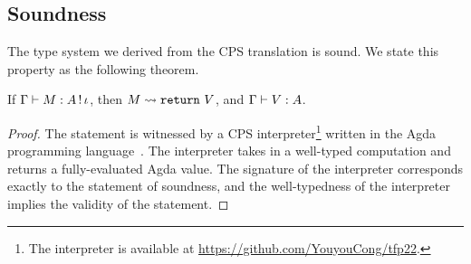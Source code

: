 \subsection{Soundness}
\label{sec:type2:sound}

The type system we derived from the CPS translation is sound.
We state this property as the following theorem.

\begin{theorem}
\label{thm:soundtype}
If $\Gamma \vdash M : A \, ! \, \iota$, then $M \leadsto \texttt{return} \ V$,
and $\Gamma \vdash V : A$.
\end{theorem}

\begin{proof}
The statement is witnessed by a CPS interpreter\footnote{The interpreter is
available at \url{https://github.com/YouyouCong/tfp22}.}
written in the Agda programming language~\cite{norell-phd}.
The interpreter takes in a well-typed \lambdah computation and returns
a fully-evaluated Agda value.
The signature of the interpreter corresponds exactly to the statement of
soundness, and the well-typedness of the interpreter implies the validity
of the statement.
\end{proof}

